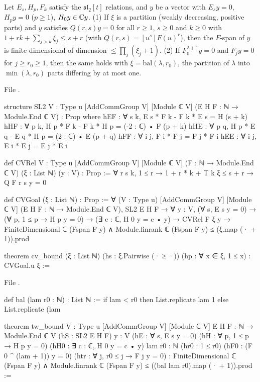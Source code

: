 \begin{theorem}\label{l26:thm:cv}
Let $E_s,H_p,F_k$ satisfy the $\mathfrak{sl}_2[t]$ relations, and $y$ be a vector with $E_sy=0$, $H_py=0$ ($p\ge1$),
$H_0y\in{\mathbb{C}} y$. (1) If $\xi$ is a partition (weakly decreasing, positive parts) and $y$ satisfies
$Q(r,s)y=0$ for all $r\ge1$, $s\ge0$ and $k\ge0$ with $1+rk+\sum_{j>k}\xi_j\le s+r$ (with $Q(r,s)=[u^s]F(u)^r$), then the $F$-span of $y$ is
finite-dimensional of dimension $\le\prod_j(\xi_j+1)$. (2) If $F_0^{\lambda+1}y=0$ and $F_jy=0$ for $j\ge r_0\ge1$, then
the same holds with $\xi=\mathrm{bal}(\lambda,r_0)$, the partition of $\lambda$ into $\min(\lambda,r_0)$ parts differing by at
most one.
\end{theorem}
\noindent File .
\begin{leancode}
structure SL2 {V : Type u} [AddCommGroup V] [Module ℂ V] (E H F : ℕ → Module.End ℂ V) : Prop where
  hEF : ∀ s k, E s * F k - F k * E s = H (s + k)
  hHF : ∀ p k, H p * F k - F k * H p = (-2 : ℂ) • F (p + k)
  hHE : ∀ p q, H p * E q - E q * H p = (2 : ℂ) • E (p + q)
  hFF : ∀ i j, F i * F j = F j * F i
  hEE : ∀ i j, E i * E j = E j * E i

def CVRel {V : Type u} [AddCommGroup V] [Module ℂ V] (F : ℕ → Module.End ℂ V) (ξ : List ℕ) (y : V) :
    Prop :=
  ∀ r s k, 1 ≤ r → 1 + r * k + T k ξ ≤ s + r → Q F r s y = 0

def CVGoal (ξ : List ℕ) : Prop :=
  ∀ (V : Type u) [AddCommGroup V] [Module ℂ V] (E H F : ℕ → Module.End ℂ V), SL2 E H F →
    ∀ y : V, (∀ s, E s y = 0) → (∀ p, 1 ≤ p → H p y = 0) → (∃ c : ℂ, H 0 y = c • y) →
      CVRel F ξ y → FiniteDimensional ℂ (Fspan F y) ∧
        Module.finrank ℂ (Fspan F y) ≤ (ξ.map (· + 1)).prod

theorem cv_bound (ξ : List ℕ) (hs : ξ.Pairwise (· ≥ ·)) (hp : ∀ x ∈ ξ, 1 ≤ x) : CVGoal.{u} ξ :=
\end{leancode}
\noindent File .
\begin{leancode}
def bal (lam r0 : ℕ) : List ℕ :=
  if lam < r0 then List.replicate lam 1
  else List.replicate (lam %

theorem tw_bound {V : Type u} [AddCommGroup V] [Module ℂ V] {E H F : ℕ → Module.End ℂ V}
    (hS : SL2 E H F) {y : V} (hE : ∀ s, E s y = 0) (hH : ∀ p, 1 ≤ p → H p y = 0)
    (hH0 : ∃ c : ℂ, H 0 y = c • y) {lam r0 : ℕ} (hr0 : 1 ≤ r0) (hF0 : (F 0 ^ (lam + 1)) y = 0)
    (htr : ∀ j, r0 ≤ j → F j y = 0) :
    FiniteDimensional ℂ (Fspan F y) ∧
      Module.finrank ℂ (Fspan F y) ≤ ((bal lam r0).map (· + 1)).prod :=
\end{leancode}

